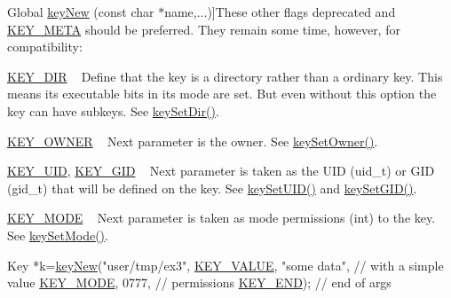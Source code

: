 \begin{DoxyRefList}
Global \hyperlink{group__key_gad23c65b44bf48d773759e1f9a4d43b89}{key\+New} (const char $\ast$name,...)]These other flags deprecated and \hyperlink{group__key_gga91fb3178848bd682000958089abbaf40a040582834bb2d90049947d7ef74e87e2}{K\+E\+Y\+\_\+\+M\+E\+T\+A} should be preferred. They remain some time, however, for compatibility\+:
\begin{DoxyItemize}
\item \hyperlink{group__key_gga91fb3178848bd682000958089abbaf40a9e43e47c8a21478538e2d20e049981d5}{K\+E\+Y\+\_\+\+D\+I\+R} ~\newline
 Define that the key is a directory rather than a ordinary key. This means its executable bits in its mode are set. But even without this option the key can have subkeys. See \hyperlink{group__meta_gaae575bd86a628a15ee45baa860522e75}{key\+Set\+Dir()}.
\item \hyperlink{group__key_gga91fb3178848bd682000958089abbaf40a77ca60362fa8daca8d5347db4385068b}{K\+E\+Y\+\_\+\+O\+W\+N\+E\+R} ~\newline
 Next parameter is the owner. See \hyperlink{owner_8c_a88d6ec200ba0707b7c1b4a88133d2be4}{key\+Set\+Owner()}.
\item \hyperlink{group__key_gga91fb3178848bd682000958089abbaf40a28f01a87d65f065172f734c9c9446c0e}{K\+E\+Y\+\_\+\+U\+I\+D}, \hyperlink{group__key_gga91fb3178848bd682000958089abbaf40ac0628bbaba7c837ca73323681393d15f}{K\+E\+Y\+\_\+\+G\+I\+D} ~\newline
 Next parameter is taken as the U\+I\+D (uid\+\_\+t) or G\+I\+D (gid\+\_\+t) that will be defined on the key. See \hyperlink{group__meta_gab5f284f5ecd261e0a290095f50ba1af7}{key\+Set\+U\+I\+D()} and \hyperlink{group__meta_ga9e3d0fb3f7ba906e067727b9155d22e3}{key\+Set\+G\+I\+D()}.
\item \hyperlink{group__key_gga91fb3178848bd682000958089abbaf40a1b0a91ff3a855d6993930ebf0abaa518}{K\+E\+Y\+\_\+\+M\+O\+D\+E} ~\newline
 Next parameter is taken as mode permissions (int) to the key. See \hyperlink{group__meta_ga8803037e35b9da1ce492323a88ff6bc3}{key\+Set\+Mode()}. 
\begin{DoxyCodeInclude}
Key *k=\hyperlink{group__key_gad23c65b44bf48d773759e1f9a4d43b89}{keyNew}(\textcolor{stringliteral}{"user/tmp/ex3"},
        \hyperlink{group__key_gga91fb3178848bd682000958089abbaf40ac66e4a49d09212b79f5754ca6db5bd2e}{KEY\_VALUE}, \textcolor{stringliteral}{"some data"},    \textcolor{comment}{// with a simple value}
        \hyperlink{group__key_gga91fb3178848bd682000958089abbaf40a1b0a91ff3a855d6993930ebf0abaa518}{KEY\_MODE}, 0777,            \textcolor{comment}{// permissions}
        \hyperlink{group__key_gga91fb3178848bd682000958089abbaf40aa8adb6fcb92dec58fb19410eacfdd403}{KEY\_END});                  \textcolor{comment}{// end of args}
\end{DoxyCodeInclude}


\end{DoxyItemize}
\end{DoxyRefList}
